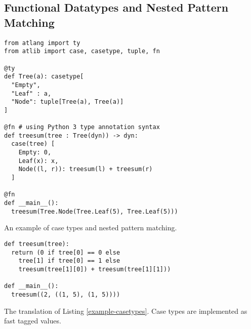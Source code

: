 \documentclass[9pt]{sigplanconf}
\begin{document}
\subsection{Functional Datatypes and Nested Pattern Matching}
\begin{codelisting}[t]
\begin{lstlisting}
from atlang import ty
from atlib import case, casetype, tuple, fn

@ty
def Tree(a): casetype[
  "Empty",
  "Leaf" : a,
  "Node": tuple[Tree(a), Tree(a)]
]

@fn # using Python 3 type annotation syntax
def treesum(tree : Tree(dyn)) -> dyn:
  case(tree) [
    Empty: 0,
    Leaf(x): x,
    Node((l, r)): treesum(l) + treesum(r)
  ]

@fn
def __main__():
  treesum(Tree.Node(Tree.Leaf(5), Tree.Leaf(5)))
\end{lstlisting}
\caption{An example of case types and nested pattern matching.}
\label{example-casetypes}
\end{codelisting}
\begin{codelisting}[t]
\begin{lstlisting}
def treesum(tree):
  return (0 if tree[0] == 0 else 
    tree[1] if tree[0] == 1 else 
    treesum(tree[1][0]) + treesum(tree[1][1]))

def __main__():
  treesum((2, ((1, 5), (1, 5))))
\end{lstlisting}
\caption{The translation of Listing \ref{example-casetypes}. Case types are implemented as fast tagged values.}
\label{example-casetypes-out}
\end{codelisting}
\end{document}
